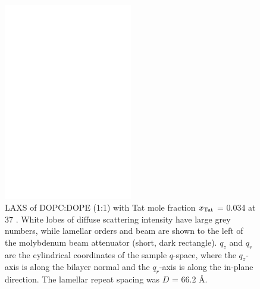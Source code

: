 \begin{figure}[htbp]
  \centering
  \includegraphics[width=0.5\textwidth]{figures/Tat/NFIT_results/dopcdope1to1}
  \caption[LAXS of DOPC:DOPE (1:1) with Tat mole fraction $\xTat$ = 0.034 at 37 \textcelsius]
  {LAXS of DOPC:DOPE (1:1) with Tat mole fraction $\xTat$ = 0.034 at 37 \textcelsius. 
  White lobes of diffuse scattering intensity have large grey numbers, while
  lamellar orders and beam are shown to the left of the
  molybdenum beam attenuator (short, dark rectangle). $q_z$ and $q_r$ are the 
  cylindrical coordinates of the sample $q$-space, where the $q_z$-axis is along 
  the bilayer normal and the $q_r$-axis is along the in-plane direction. 
  The lamellar repeat spacing was $D$ = 66.2 \AA.}
  \label{fig:figure1}
\end{figure}

